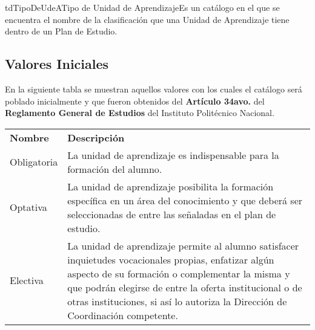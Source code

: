 \begin{TipoDeDato}{tdTipoDeUdeA}{Tipo de Unidad de Aprendizaje}{Es un catálogo en el que se encuentra el nombre de la clasificación que una Unidad de Aprendizaje tiene dentro de un Plan de Estudio.}

	\begin{tdAtributos}
		
	
	\end{tdAtributos}
	
	\subsection{Valores Iniciales}
	 En la siguiente tabla se muestran aquellos valores con los cuales el catálogo será poblado inicialmente y que fueron obtenidos del \textbf{Artículo 34avo.} del \textbf{Reglamento General de Estudios} del Instituto Politécnico Nacional.\cdtEmpty
		
		\begin{longtable}{| p{}| p{}|}
	 			\rowcolor{colorPrincipal}
	 			\multicolumn{2}{c}{\bf \color{white} Valores Iniciales}\\
	 			\hline
	 			\rowcolor{colorSecundario}
	 			\bf \color{white} Nombre  & \bf \color{white} Descripción\\
	 			\hline
	 			Obligatoria & La unidad de aprendizaje es indispensable para la formación del alumno.\\
	 			\hline 
	 			Optativa & La unidad de aprendizaje posibilita la formación específica en un área del conocimiento y que deberá ser seleccionadas de entre las señaladas en el plan de estudio.\\
	 			\hline
	 			Electiva & La unidad de aprendizaje permite al alumno satisfacer inquietudes vocacionales propias, enfatizar algún aspecto de su formación o complementar la misma y que podrán elegirse de entre la oferta
institucional o de otras instituciones, si así lo autoriza la Dirección de Coordinación competente.\\
	 			\hline
	 		\end{longtable}
\end{TipoDeDato}


